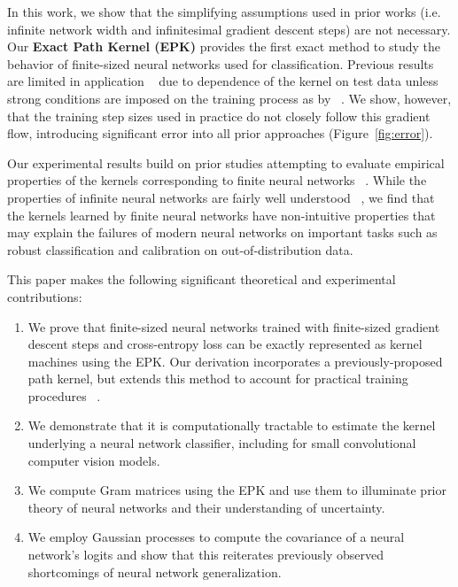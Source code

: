 In this work, we show that the simplifying assumptions used in prior works (i.e. infinite network width and infinitesimal gradient descent steps) are not necessary. Our \textbf{Exact Path Kernel (EPK)} provides the first exact method to study the behavior of finite-sized neural networks used for classification.
Previous results are limited in application ~\citep{incudini2022quantum} due to dependence of the kernel on test data unless strong conditions are imposed on the training process as by ~\citet{chen2021equivalence}. We show, however, that the training step sizes used in practice do not closely follow this gradient flow, introducing significant error into all prior approaches (Figure~\ref{fig:error}).

Our experimental results build on prior studies attempting to evaluate empirical properties of the kernels corresponding to finite neural networks ~\citep{DBLP:conf/iclr/LeeBNSPS18, chen2021equivalence}. While the properties of infinite neural networks are fairly well understood ~\citep{neal1996priors}, we find that the kernels learned by finite neural networks have non-intuitive properties that may explain the failures of modern neural networks on important tasks such as robust classification and calibration on out-of-distribution data.

This paper makes the following significant theoretical and experimental contributions:
\begin{enumerate}
    \item We prove that finite-sized neural networks trained with finite-sized gradient descent steps and cross-entropy loss can be exactly represented as kernel machines using the EPK. Our derivation incorporates a previously-proposed path kernel, but extends this method to account for practical training procedures ~\citep{domingos2020every, chen2021equivalence}.
  
    \item We demonstrate that it is computationally tractable to estimate the kernel underlying a neural network classifier, including for small convolutional computer vision models.
    \item We compute Gram matrices using the EPK and use them to illuminate prior theory of neural networks and their understanding of uncertainty. 
    \item We employ Gaussian processes to compute the covariance of a neural network's logits and show that this reiterates previously observed shortcomings of neural network generalization.
\end{enumerate}


